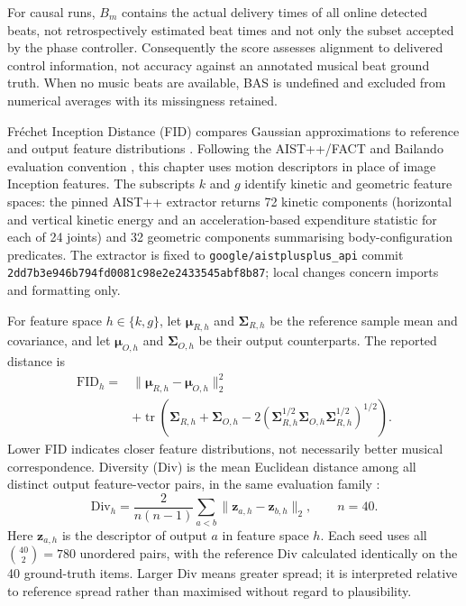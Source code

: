 For causal runs, $B_m$ contains the actual delivery times of all online detected
beats, not retrospectively estimated beat times and not only the subset accepted
by the phase controller. Consequently the score assesses alignment to delivered
control information, not accuracy against an annotated musical beat ground truth.
When no music beats are available, BAS is undefined and excluded from numerical
averages with its missingness retained.

Fr\'echet Inception Distance (FID) compares Gaussian approximations to reference
and output feature distributions \cite{heusel2017gans}. Following the
AIST++/FACT and Bailando evaluation convention \cite{li2021ai,siyao2022bailando},
this chapter uses motion descriptors in place of image Inception features.
The subscripts $k$ and $g$ identify kinetic and geometric feature spaces:
the pinned AIST++ extractor returns 72 kinetic components (horizontal and
vertical kinetic energy and an acceleration-based expenditure statistic for
each of 24 joints) and 32 geometric components summarising body-configuration
predicates. The extractor is fixed to
\texttt{google/aistplusplus\_api} commit
\texttt{2dd7b3e946b794fd0081c98e2e2433545abf8b87}; local changes concern imports
and formatting only.

For feature space $h\in\{k,g\}$, let $\boldsymbol{\mu}_{R,h}$ and
$\boldsymbol{\Sigma}_{R,h}$ be the reference sample mean and covariance, and
let $\boldsymbol{\mu}_{O,h}$ and $\boldsymbol{\Sigma}_{O,h}$ be their output
counterparts. The reported distance is
\begin{equation}
\begin{split}
\mathrm{FID}_h={}&\|\boldsymbol{\mu}_{R,h}-\boldsymbol{\mu}_{O,h}\|_2^2\\
&+\operatorname{tr}\!\left(\boldsymbol{\Sigma}_{R,h}
+\boldsymbol{\Sigma}_{O,h}
-2\left(\boldsymbol{\Sigma}_{R,h}^{1/2}\boldsymbol{\Sigma}_{O,h}
\boldsymbol{\Sigma}_{R,h}^{1/2}\right)^{1/2}\right).
\end{split}
\label{eq:ch6_fid}
\end{equation}
Lower FID indicates closer feature distributions, not necessarily better
musical correspondence. Diversity (Div) is the mean Euclidean distance among
all distinct output feature-vector pairs, in the same evaluation family
\cite{siyao2022bailando}:
\begin{equation}
\mathrm{Div}_h=\frac{2}{n(n-1)}\sum_{a<b}
\|\mathbf{z}_{a,h}-\mathbf{z}_{b,h}\|_2,\qquad n=40.
\label{eq:ch6_div}
\end{equation}
Here $\mathbf{z}_{a,h}$ is the descriptor of output $a$ in feature space $h$.
Each seed uses all $\binom{40}{2}=780$ unordered pairs, with the reference
Div calculated identically on the 40 ground-truth items. Larger Div means
greater spread; it is interpreted relative to reference spread rather than
maximised without regard to plausibility.


